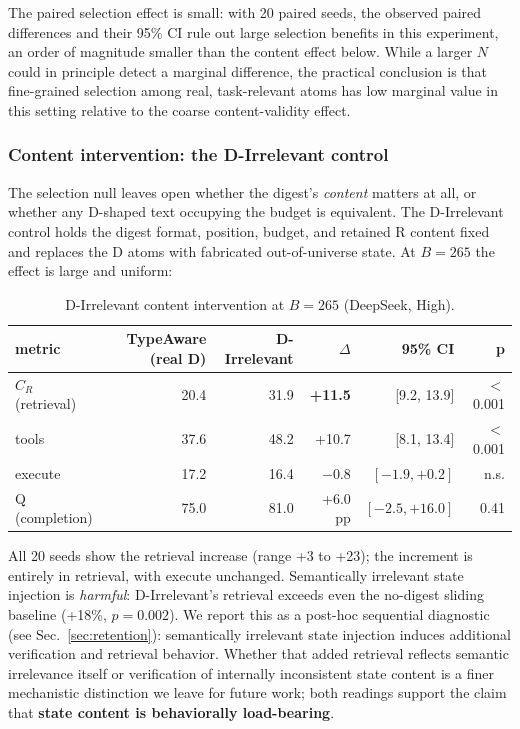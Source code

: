 \documentclass[11pt]{article}
\begin{document}
The paired selection effect is small: with 20 paired seeds, the observed paired
differences and their 95\% CI rule out large selection benefits in this experiment, an order of
magnitude smaller than the content effect below. While a larger $N$ could in principle detect a marginal difference, the practical
conclusion is that fine-grained selection among real, task-relevant atoms has low marginal
value in this setting relative to the coarse content-validity effect.

\subsubsection{Content intervention: the D-Irrelevant control}
\label{sec:content}

The selection null leaves open whether the digest's \emph{content} matters at all, or whether
any D-shaped text occupying the budget is equivalent. The D-Irrelevant control holds the
digest format, position, budget, and retained R content fixed and replaces the D atoms
with fabricated out-of-universe state. At $B=265$ the effect is large and uniform:

\begin{table}[t]
\centering
\small
\caption{D-Irrelevant content intervention at $B=265$ (DeepSeek, High).}
\label{tab:content}
\begin{tabular}{@{}lrrrrr@{}}
\toprule
metric & TypeAware (real D) & D-Irrelevant & $\Delta$ & 95\% CI & p \\
\midrule
$C_R$ (retrieval) & 20.4 & 31.9 & \textbf{+11.5} & [9.2, 13.9] & $<$0.001 \\
tools & 37.6 & 48.2 & +10.7 & [8.1, 13.4] & $<$0.001 \\
execute & 17.2 & 16.4 & $-0.8$ & $[-1.9, +0.2]$ & n.s. \\
Q (completion) & 75.0 & 81.0 & +6.0 pp & $[-2.5, +16.0]$ & 0.41 \\
\bottomrule
\end{tabular}
\end{table}

All 20 seeds show the retrieval increase (range +3 to +23); the increment is entirely in
retrieval, with execute unchanged. Semantically irrelevant state injection is \emph{harmful}:
D-Irrelevant's retrieval exceeds even the no-digest sliding baseline (+18\%, $p = 0.002$).
We report this as a post-hoc sequential diagnostic (see Sec.~\ref{sec:retention}): semantically irrelevant
state injection induces additional verification and retrieval behavior. Whether that
added retrieval reflects semantic irrelevance itself or verification of internally
inconsistent state content is a finer mechanistic distinction we leave for future work;
both readings support the claim that \textbf{state content is behaviorally load-bearing}.
\end{document}
